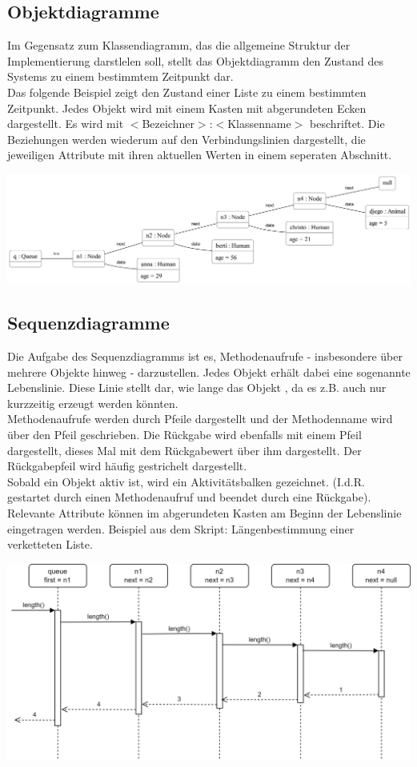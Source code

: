 \documentclass{article}
\begin{document}
\subsection{Objektdiagramme}

Im Gegensatz zum Klassendiagramm, das die allgemeine Struktur der Implementierung darstlelen soll, stellt das Objektdiagramm den Zustand des Systems zu einem bestimmtem Zeitpunkt dar.  \\ 
Das folgende Beispiel zeigt den Zustand einer Liste zu einem bestimmten Zeitpunkt. Jedes Objekt wird mit einem Kasten mit abgerundeten Ecken dargestellt. Es wird mit $<$Bezeichner$>$:$<$Klassenname$>$ beschriftet. Die Beziehungen werden wiederum auf den Verbindungslinien dargestellt, die jeweiligen Attribute mit ihren aktuellen Werten in einem seperaten Abschnitt. 

\begin{center}
    \includegraphics[scale=0.15]{../media/linked_list_nodes_objectdiagram_v2.png}
\end{center}

\subsection{Sequenzdiagramme}

Die Aufgabe des Sequenzdiagramms ist es, Methodenaufrufe - insbesondere über mehrere Objekte hinweg - darzustellen. Jedes Objekt erhält dabei eine sogenannte Lebenslinie. Diese Linie stellt dar, wie lange das Objekt , da es z.B. auch nur kurzzeitig erzeugt werden könnten. \\
Methodenaufrufe werden durch Pfeile dargestellt und der Methodenname wird über den Pfeil geschrieben. Die Rückgabe wird ebenfalls mit einem Pfeil dargestellt, dieses Mal mit dem Rückgabewert über ihm dargestellt. Der Rückgabepfeil wird häufig gestrichelt dargestellt.\\
Sobald ein Objekt aktiv ist, wird ein Aktivitätsbalken gezeichnet. (I.d.R. gestartet durch einen Methodenaufruf und beendet durch eine Rückgabe). \\
Relevante Attribute können im abgerundeten Kasten am Beginn der Lebenslinie eingetragen werden.
Beispiel aus dem Skript: Längenbestimmung einer verketteten Liste.

\begin{center}
    \includegraphics[scale=0.2]{../media/length_sequence.png}
\end{center}
\end{document}
